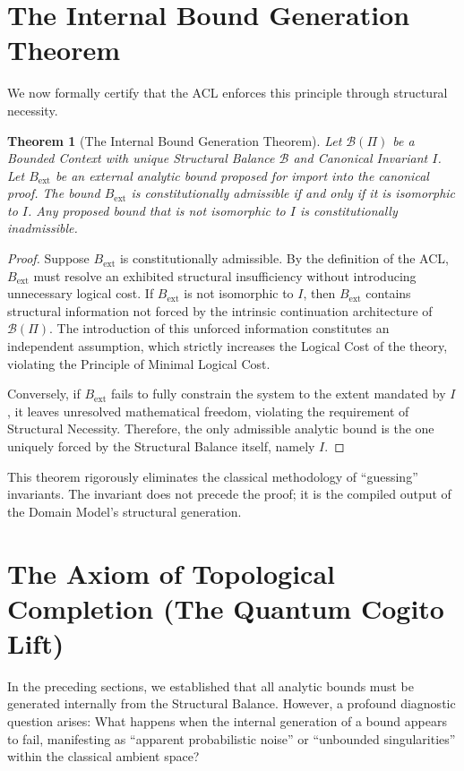 \documentclass[12pt,openany]{extbook}
\theoremstyle{plain}
\newtheorem{theorem}{Theorem}[chapter]
\theoremstyle{definition}
\begin{document}
\section{The Internal Bound Generation Theorem}

We now formally certify that the ACL enforces this principle through structural necessity.

\begin{theorem}[The Internal Bound Generation Theorem]
Let $\mathcal{B}(\Pi)$ be a Bounded Context with unique Structural Balance $\mathcal{B}$ and Canonical Invariant $I$. Let $B_{\mathrm{ext}}$ be an external analytic bound proposed for import into the canonical proof. The bound $B_{\mathrm{ext}}$ is constitutionally admissible if and only if it is isomorphic to $I$. Any proposed bound that is not isomorphic to $I$ is constitutionally inadmissible.
\end{theorem}

\begin{proof}
Suppose $B_{\mathrm{ext}}$ is constitutionally admissible. By the definition of the ACL, $B_{\mathrm{ext}}$ must resolve an exhibited structural insufficiency without introducing unnecessary logical cost. If $B_{\mathrm{ext}}$ is not isomorphic to $I$, then $B_{\mathrm{ext}}$ contains structural information not forced by the intrinsic continuation architecture of $\mathcal{B}(\Pi)$. The introduction of this unforced information constitutes an independent assumption, which strictly increases the Logical Cost of the theory, violating the Principle of Minimal Logical Cost.

Conversely, if $B_{\mathrm{ext}}$ fails to fully constrain the system to the extent mandated by $I$, it leaves unresolved mathematical freedom, violating the requirement of Structural Necessity. Therefore, the only admissible analytic bound is the one uniquely forced by the Structural Balance itself, namely $I$.
\end{proof}

This theorem rigorously eliminates the classical methodology of ``guessing'' invariants. The invariant does not precede the proof; it is the compiled output of the Domain Model's structural generation.

\section{The Axiom of Topological Completion (The Quantum Cogito Lift)}

In the preceding sections, we established that all analytic bounds must be generated internally from the Structural Balance. However, a profound diagnostic question arises: What happens when the internal generation of a bound appears to fail, manifesting as ``apparent probabilistic noise'' or ``unbounded singularities'' within the classical ambient space?
\end{document}
